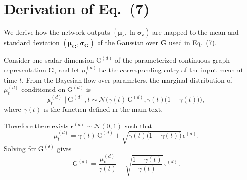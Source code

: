 



% 

\clearpage
\onecolumn

\section{Derivation of Eq.~(7)}
\label{app:eq7:derivation}

We derive how the network outputs $(\boldsymbol{\mu}_\epsilon, \ln\boldsymbol{\sigma}_\epsilon)$ are mapped to the mean and standard deviation $(\boldsymbol{\mu}_\mathbf{G}, \boldsymbol{\sigma}_\mathbf{G})$ of the Gaussian over $\mathbf{G}$ used in Eq.~(7).

Consider one scalar dimension $\mathrm{G}^{(d)}$ of the parameterized continuous graph representation $\mathbf{G}$, and let $\mu_t^{(d)}$ be the corresponding entry of the input mean at time $t$.
From the Bayesian flow over parameters, the marginal distribution of $\mu_t^{(d)}$ conditioned on $\mathrm{G}^{(d)}$ is
\begin{equation}
    \mu_t^{(d)} \mid \mathrm{G}^{(d)}, t
    \sim
    \mathcal{N}\!\big(
        \gamma(t)\,\mathrm{G}^{(d)},
        \gamma(t)\bigl(1-\gamma(t)\bigr)
    \big),
\end{equation}
where $\gamma(t)$ is the function defined in the main text.

Therefore there exists $\epsilon^{(d)} \sim \mathcal{N}(0,1)$ such that
\begin{equation}
    \mu_t^{(d)}
    =
    \gamma(t)\,\mathrm{G}^{(d)}
    +
    \sqrt{\gamma(t)\bigl(1-\gamma(t)\bigr)}\,
    \epsilon^{(d)}.
\end{equation}
Solving for $\mathrm{G}^{(d)}$ gives
\begin{equation}
    \mathrm{G}^{(d)}
    =
    \frac{\mu_t^{(d)}}{\gamma(t)}
    -
    \sqrt{\frac{1-\gamma(t)}{\gamma(t)}}\,
    \epsilon^{(d)}.
    \label{eq:app-G-from-eps}
\end{equation}

